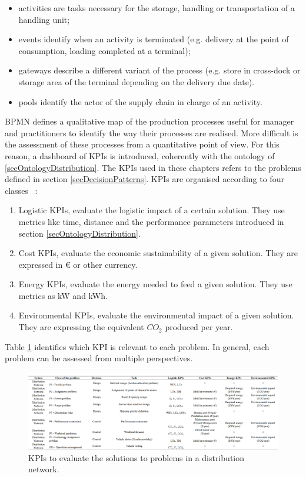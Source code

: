 \begin{itemize}
    \item activities are tasks necessary for the storage, handling or transportation of a handling unit;
    \item events identify when an activity is terminated (e.g. delivery at the point of consumption, loading completed at a terminal);
    \item gateways describe a different variant of the process (e.g. store in cross-dock or storage area of the terminal depending on the delivery due date).
    \item pools identify the actor of the supply chain in charge of an activity.

\end{itemize}

BPMN defines a qualitative map of the production processes useful for manager and practitioners to identify the way their processes are realised. More difficult is the assessment of these processes from a quantitative point of view. For this reason, a dashboard of KPIs is introduced, coherently with the ontology of \ref{secOntologyDistribution}. The KPIs used in these chapters refers to the problems defined in section \ref{secDecisionPatterns}. KPIs are organised according to four classes ~\cite{Tufano2018}:

\begin{enumerate}
    \item Logistic KPIs, evaluate the logistic impact of a certain solution. They use metrics like time, distance and the performance parameters introduced in section \ref{secOntologyDistribution}.
	\item Cost KPIs, evaluate the economic sustainability of a given solution. They are expressed in \euro{} or other currency.
	\item Energy KPIs, evaluate the energy needed to feed a given solution. They use metrics as kW and kWh.
	\item Environmental KPIs, evaluate the environmental impact of a given solution. They are expressing the equivalent $CO_2$ produced per year.

\end{enumerate}
Table \ref{tab_KPIs} identifies which KPI is relevant to each problem. In general, each problem can be assessed from multiple perspectives.

\begin{figure}[hbt!]
\centering
\includegraphics[width=1.0\textwidth]{SectionDistribution/control_figures/tab_KPIs.png}
\captionsetup{type=table}
\caption{KPIs to evaluate the solutions to problems in a distribution network.}
\label{tab_KPIs}
\end{figure}

